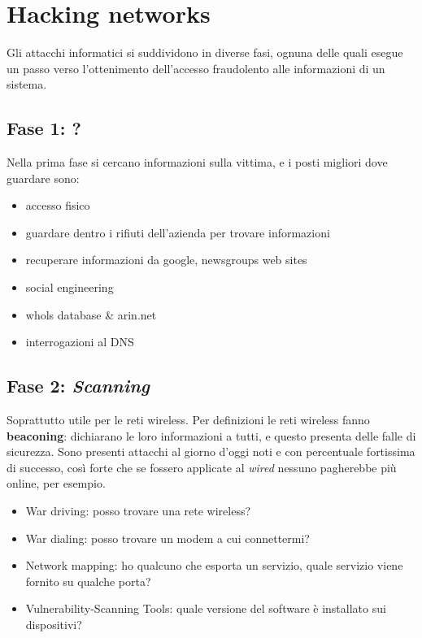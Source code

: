 
\section{Hacking networks}

Gli attacchi informatici si suddividono in diverse fasi, ognuna delle quali 
esegue un passo verso l'ottenimento dell'accesso fraudolento alle informazioni 
di un sistema.

\subsection{Fase 1: ?}

Nella prima fase si cercano informazioni sulla vittima, e i posti migliori dove 
guardare sono:
\begin{itemize}
 \item accesso fisico
 \item guardare dentro i rifiuti dell'azienda per trovare informazioni
 \item recuperare informazioni da google, newsgroups web sites
 \item social engineering
 \item whols database \& arin.net
 \item interrogazioni al DNS
\end{itemize}

\subsection{Fase 2: \textit{Scanning}}

Soprattutto utile per le reti wireless. Per definizioni le reti wireless fanno 
\textbf{beaconing}: dichiarano le loro informazioni a tutti, e questo presenta 
delle falle di sicurezza. Sono presenti attacchi al giorno d'oggi noti e con 
percentuale fortissima di successo, così forte che se fossero applicate al 
\textit{wired} nessuno pagherebbe più online, per esempio.

\begin{itemize}
\item War driving: posso trovare una rete wireless?
\item War dialing: posso trovare un modem a cui connettermi?
\item Network mapping: ho qualcuno che esporta un servizio, quale servizio 
viene fornito su qualche porta?
\item Vulnerability-Scanning Tools: quale versione del software è installato 
sui dispositivi?
\end{itemize}

